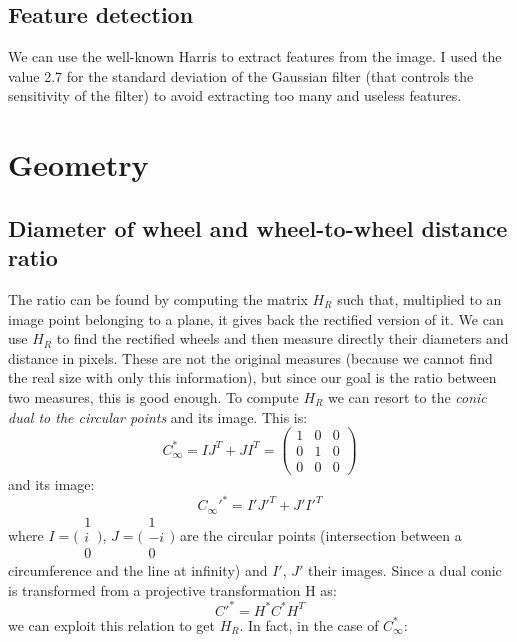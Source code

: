 \documentclass{article}
\begin{document}
\subsection{Feature detection}
We can use the well-known Harris to extract features from the image. I used the value 2.7 for the standard deviation of the Gaussian filter (that controls the sensitivity of the filter) to avoid extracting too many and useless features.

\newpage
\section{Geometry}
\subsection{Diameter of wheel and wheel-to-wheel distance ratio}
The ratio can be found by computing the matrix $H_R$ such that, multiplied to an image point belonging to a plane, it gives back the rectified version of it. We can use $H_R$ to find the rectified wheels and then measure directly their diameters and distance in pixels. These are not the original measures (because we cannot find the real size with only this information), but since our goal is the ratio between two measures, this is good enough.
To compute $H_R$ we can resort to the \textit{conic dual to the circular points} and its image. This is:
$$ C_\infty^* = IJ^T + JI^T = \begin{pmatrix}
1 & 0 & 0 \\
0 & 1 & 0 \\
0 & 0 & 0
\end{pmatrix}
$$
and its image:
\begin{equation}
C_\infty'^* = I'J'^T + J'I'^T
\end{equation}
where $I = \bigl(\begin{smallmatrix}1 \\ i \\ 0 \end{smallmatrix} \bigr)$, $J = \bigl(\begin{smallmatrix}1 \\ -i \\ 0 \end{smallmatrix} \bigr)$ are the circular points (intersection between a circumference and the line at infinity) and $I'$, $J'$ their images.
Since a dual conic is transformed from a projective transformation H as:
$$ C'^* = H^* C^* H^T $$
we can exploit this relation to get $H_R$. In fact, in the case of $C_\infty^*$:
\end{document}

